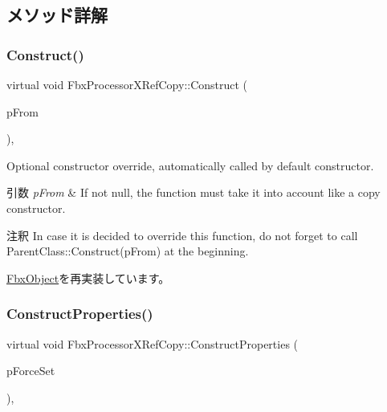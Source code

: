 \subsection{メソッド詳解}
\mbox{\label{class_fbx_processor_x_ref_copy_a025831c438813ebe4ef619ea5b00d2fd}} 
\subsubsection{\texorpdfstring{Construct()}{Construct()}}
{\footnotesize\ttfamily virtual void Fbx\+Processor\+X\+Ref\+Copy\+::\+Construct (\begin{DoxyParamCaption}\item[{const \hyperlink{class_fbx_object}{Fbx\+Object} $\ast$}]{p\+From }\end{DoxyParamCaption})\hspace{0.3cm}{\ttfamily [protected]}, {\ttfamily [virtual]}}

Optional constructor override, automatically called by default constructor. 
\begin{DoxyParams}{引数}
{\em p\+From} & If not null, the function must take it into account like a copy constructor. \\
\hline
\end{DoxyParams}
\begin{DoxyRemark}{注釈}
In case it is decided to override this function, do not forget to call Parent\+Class\+::\+Construct(p\+From) at the beginning. 
\end{DoxyRemark}


\hyperlink{class_fbx_object_a313503bc645af3fdceb4a99ef5cea7eb}{Fbx\+Object}を再実装しています。

\mbox{\label{class_fbx_processor_x_ref_copy_afccc4a20df6bee60d5ce2a7a9ca11666}} 
\subsubsection{\texorpdfstring{Construct\+Properties()}{ConstructProperties()}}
{\footnotesize\ttfamily virtual void Fbx\+Processor\+X\+Ref\+Copy\+::\+Construct\+Properties (\begin{DoxyParamCaption}\item[{bool}]{p\+Force\+Set }\end{DoxyParamCaption})\hspace{0.3cm}{\ttfamily [protected]}, {\ttfamily [virtual]}}


